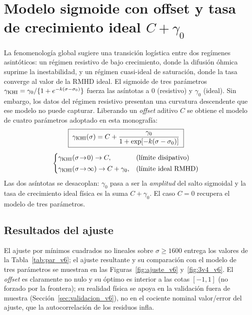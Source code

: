 \section[Modelo sigmoide con \emph{offset}]{Modelo sigmoide con offset y tasa de crecimiento ideal $C+\gamma_0$}
\label{sec:sigmoide_v6}

\primerparrafo La fenomenología global sugiere una transición logística entre dos regímenes asintóticos: un régimen resistivo de bajo crecimiento, donde la difusión óhmica suprime la inestabilidad, y un régimen cuasi-ideal de saturación, donde la tasa converge al valor de la RMHD ideal. El sigmoide de tres parámetros $\gamma_{\mathrm{KHI}}=\gamma_0/\{1+e^{-k(\sigma-\sigma_0)}\}$ fuerza las asíntotas a $0$ (resistivo) y $\gamma_0$ (ideal). Sin embargo, los datos del régimen resistivo presentan una curvatura descendente que ese modelo no puede capturar. Liberando un \emph{offset} aditivo $C$ se obtiene el modelo de cuatro parámetros adoptado en esta monografía:
\begin{equation}
\begin{gathered}
\boxed{\;\gamma_{\mathrm{KHI}}(\sigma)=C+\dfrac{\gamma_0}{1+\exp[-k(\sigma-\sigma_0)]}\;}\\[4pt]
\begin{cases}
\gamma_{\mathrm{KHI}}(\sigma\!\to\!0)\to C, & \text{(límite disipativo)}\\[2pt]
\gamma_{\mathrm{KHI}}(\sigma\!\to\!\infty)\to C+\gamma_0, & \text{(límite ideal RMHD)}
\end{cases}
\end{gathered}
\label{eq:sigmoide_v6}
\end{equation}
Las dos asíntotas se desacoplan: $\gamma_0$ pasa a ser la \emph{amplitud} del salto sigmoidal y la tasa de crecimiento ideal física es la suma $C+\gamma_0$. El caso $C=0$ recupera el modelo de tres parámetros.

\subsection{Resultados del ajuste}

\primerparrafo El ajuste por mínimos cuadrados no lineales  sobre $\sigma\ge1600$ entrega los valores de la Tabla~\ref{tab:par_v6}; el ajuste resultante y su comparación con el modelo de tres parámetros se muestran en las Figuras~\ref{fig:ajuste_v6} y~\ref{fig:3v4_v6}. El \emph{offset} es claramente no nulo y su óptimo es interior a las cotas $[-1,1]$ (no forzado por la frontera); su realidad física se apoya en la validación fuera de muestra (Sección~\ref{sec:validacion_v6}), no en el cociente nominal valor/error del ajuste, que la autocorrelación de los residuos infla.

